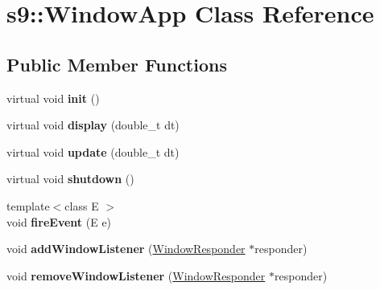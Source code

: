 \hypertarget{classs9_1_1WindowApp}{\section{s9\-:\-:\-Window\-App \-Class \-Reference}
\label{classs9_1_1WindowApp}
}
\subsection*{\-Public \-Member \-Functions}
\begin{DoxyCompactItemize}
\item 
\hypertarget{classs9_1_1WindowApp_ae9028614a6f0156549783f269277a7f6}{virtual void {\bfseries init} ()}\label{classs9_1_1WindowApp_ae9028614a6f0156549783f269277a7f6}

\item 
\hypertarget{classs9_1_1WindowApp_a83b54e6b0e8827690d8da9e7e0aa67b0}{virtual void {\bfseries display} (double\-\_\-t dt)}\label{classs9_1_1WindowApp_a83b54e6b0e8827690d8da9e7e0aa67b0}

\item 
\hypertarget{classs9_1_1WindowApp_a313c1f555b345989f2a0f63a2cc9f0df}{virtual void {\bfseries update} (double\-\_\-t dt)}\label{classs9_1_1WindowApp_a313c1f555b345989f2a0f63a2cc9f0df}

\item 
\hypertarget{classs9_1_1WindowApp_af86f0b24069adf0923177e44a65e8853}{virtual void {\bfseries shutdown} ()}\label{classs9_1_1WindowApp_af86f0b24069adf0923177e44a65e8853}

\item 
\hypertarget{classs9_1_1WindowApp_ae4d66d21443785ac8f5e84b4a06feb61}{{\footnotesize template$<$class E $>$ }\\void {\bfseries fire\-Event} (\-E e)}\label{classs9_1_1WindowApp_ae4d66d21443785ac8f5e84b4a06feb61}

\item 
\hypertarget{classs9_1_1WindowApp_a9bd82d7225895c6b4ca626bea6ce465c}{void {\bfseries add\-Window\-Listener} (\hyperlink{classs9_1_1WindowResponder}{\-Window\-Responder} $\ast$responder)}\label{classs9_1_1WindowApp_a9bd82d7225895c6b4ca626bea6ce465c}

\item 
\hypertarget{classs9_1_1WindowApp_ac972925c424384d04842bb9f148cd5dd}{void {\bfseries remove\-Window\-Listener} (\hyperlink{classs9_1_1WindowResponder}{\-Window\-Responder} $\ast$responder)}\label{classs9_1_1WindowApp_ac972925c424384d04842bb9f148cd5dd}

\end{DoxyCompactItemize}
